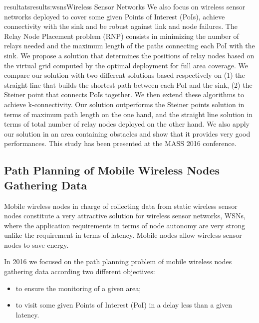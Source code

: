 \documentclass{ra2016}
\begin{document}
\begin{module}{resultats}{results:wsns}{Wireless Sensor Networks}
We also focus on wireless sensor networks deployed to cover some given Points of Interest (PoIs), achieve connectivity with the sink and be robust against link and node failures. 
The Relay Node Placement problem (RNP) consists in minimizing the number of relays needed and the maximum length of the paths connecting each PoI with the sink. 
We propose a solution that determines the positions of relay nodes based on the virtual grid computed by the optimal deployment for full area coverage.
We compare our solution with two different solutions based respectively on
(1) the straight line that builds the shortest path between each PoI and the sink,
(2) the Steiner point that connects PoIs together.
We then extend these algorithms to achieve k-connectivity.
Our solution outperforms the Steiner points solution in terms of maximum path length on the one hand, and the straight line solution in terms of total number of relay nodes deployed on the other hand.
We also apply our solution in an area containing obstacles and show that it provides very good performances.
This study has been presented at the MASS 2016 conference.

\subsection{Path Planning of Mobile Wireless Nodes Gathering Data}

\begin{participants}
\end{participants}

Mobile wireless nodes in charge of collecting data from static wireless sensor nodes constitute a very attractive solution for wireless sensor networks, WSNs, where the application requirements in terms of node autonomy are very strong unlike the requirement in terms of latency.
Mobile nodes allow wireless sensor nodes to save energy.

In 2016 we focused on the path planning problem of mobile wireless nodes gathering data according two different objectives:

\begin{itemize}
    \item to ensure the monitoring of a given area;
    \item to visit some given Points of Interest (PoI) in a delay less than a given latency.
\end{itemize}


\end{module}
\end{document}
